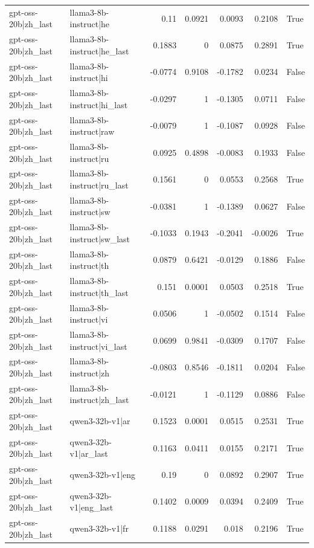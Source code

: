 \begin{table}
\begin{tabular}{l l r r r r l}
gpt-oss-20b|zh_last & llama3-8b-instruct|he & 0.11 & 0.0921 & 0.0093 & 0.2108 & True \\
gpt-oss-20b|zh_last & llama3-8b-instruct|he_last & 0.1883 & 0 & 0.0875 & 0.2891 & True \\
gpt-oss-20b|zh_last & llama3-8b-instruct|hi & -0.0774 & 0.9108 & -0.1782 & 0.0234 & False \\
gpt-oss-20b|zh_last & llama3-8b-instruct|hi_last & -0.0297 & 1 & -0.1305 & 0.0711 & False \\
gpt-oss-20b|zh_last & llama3-8b-instruct|raw & -0.0079 & 1 & -0.1087 & 0.0928 & False \\
gpt-oss-20b|zh_last & llama3-8b-instruct|ru & 0.0925 & 0.4898 & -0.0083 & 0.1933 & False \\
gpt-oss-20b|zh_last & llama3-8b-instruct|ru_last & 0.1561 & 0 & 0.0553 & 0.2568 & True \\
gpt-oss-20b|zh_last & llama3-8b-instruct|sw & -0.0381 & 1 & -0.1389 & 0.0627 & False \\
gpt-oss-20b|zh_last & llama3-8b-instruct|sw_last & -0.1033 & 0.1943 & -0.2041 & -0.0026 & True \\
gpt-oss-20b|zh_last & llama3-8b-instruct|th & 0.0879 & 0.6421 & -0.0129 & 0.1886 & False \\
gpt-oss-20b|zh_last & llama3-8b-instruct|th_last & 0.151 & 0.0001 & 0.0503 & 0.2518 & True \\
gpt-oss-20b|zh_last & llama3-8b-instruct|vi & 0.0506 & 1 & -0.0502 & 0.1514 & False \\
gpt-oss-20b|zh_last & llama3-8b-instruct|vi_last & 0.0699 & 0.9841 & -0.0309 & 0.1707 & False \\
gpt-oss-20b|zh_last & llama3-8b-instruct|zh & -0.0803 & 0.8546 & -0.1811 & 0.0204 & False \\
gpt-oss-20b|zh_last & llama3-8b-instruct|zh_last & -0.0121 & 1 & -0.1129 & 0.0886 & False \\
gpt-oss-20b|zh_last & qwen3-32b-v1|ar & 0.1523 & 0.0001 & 0.0515 & 0.2531 & True \\
gpt-oss-20b|zh_last & qwen3-32b-v1|ar_last & 0.1163 & 0.0411 & 0.0155 & 0.2171 & True \\
gpt-oss-20b|zh_last & qwen3-32b-v1|eng & 0.19 & 0 & 0.0892 & 0.2907 & True \\
gpt-oss-20b|zh_last & qwen3-32b-v1|eng_last & 0.1402 & 0.0009 & 0.0394 & 0.2409 & True \\
gpt-oss-20b|zh_last & qwen3-32b-v1|fr & 0.1188 & 0.0291 & 0.018 & 0.2196 & True \\

\end{tabular}
\end{table}
